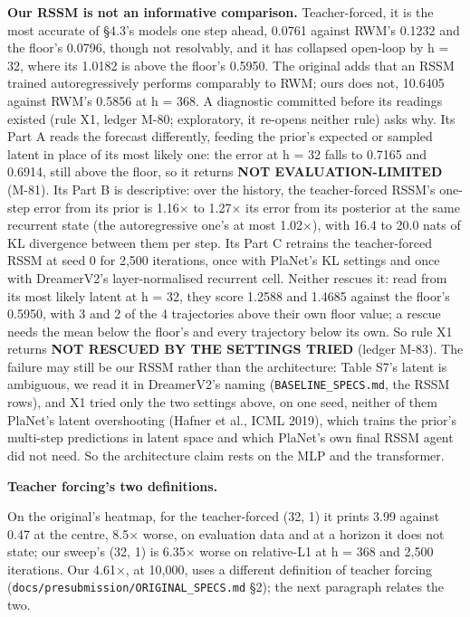 \documentclass[10pt]{article}
\begin{document}
\textbf{Our RSSM is not an informative comparison.} Teacher-forced, it is the most accurate of \S{}4.3's models one step ahead, 0.0761 against RWM's 0.1232 and the floor's 0.0796, though not resolvably, and it has collapsed open-loop by h = 32, where its 1.0182 is above the floor's 0.5950. The original adds that an RSSM trained autoregressively performs comparably to RWM; ours does not, 10.6405 against RWM's 0.5856 at h = 368. A diagnostic committed before its readings existed (rule X1, ledger M-80; exploratory, it re-opens neither rule) asks why. Its Part A reads the forecast differently, feeding the prior's expected or sampled latent in place of its most likely one: the error at h = 32 falls to 0.7165 and 0.6914, still above the floor, so it returns \textbf{NOT EVALUATION-LIMITED} (M-81). Its Part B is descriptive: over the history, the teacher-forced RSSM's one-step error from its prior is 1.16$\times$ to 1.27$\times$ its error from its posterior at the same recurrent state (the autoregressive one's at most 1.02$\times$), with 16.4 to 20.0 nats of KL divergence between them per step. Its Part C retrains the teacher-forced RSSM at seed 0 for 2,500 iterations, once with PlaNet's KL settings and once with DreamerV2's layer-normalised recurrent cell. Neither rescues it: read from its most likely latent at h = 32, they score 1.2588 and 1.4685 against the floor's 0.5950, with 3 and 2 of the 4 trajectories above their own floor value; a rescue needs the mean below the floor's and every trajectory below its own. So rule X1 returns \textbf{NOT RESCUED BY THE SETTINGS TRIED} (ledger M-83). The failure may still be our RSSM rather than the architecture: Table S7's latent is ambiguous, we read it in DreamerV2's naming (\texttt{BASELINE\_SPECS.md}, the RSSM rows), and X1 tried only the two settings above, on one seed, neither of them PlaNet's latent overshooting (Hafner et al., ICML 2019), which trains the prior's multi-step predictions in latent space and which PlaNet's own final RSSM agent did not need. So the architecture claim rests on the MLP and the transformer.

\textbf{Teacher forcing's two definitions.}

On the original's heatmap, for the teacher-forced (32, 1) it prints 3.99 against 0.47 at the centre, 8.5$\times$ worse, on evaluation data and at a horizon it does not state; our sweep's (32, 1) is 6.35$\times$ worse on relative-L1 at h = 368 and 2,500 iterations. Our 4.61$\times$, at 10,000, uses a different definition of teacher forcing (\texttt{docs/\allowbreak{}presubmission/\allowbreak{}ORIGINAL\_\allowbreak{}SPECS\allowbreak{}.md} \S{}2); the next paragraph relates the two.
\end{document}
